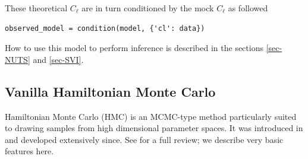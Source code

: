 \documentclass[twocolumn,twocolappendix,nofootinbib,iop]{openjournal}
\newcommand{\nblink}[1]{\href{https://github.com/DifferentiableUniverseInitiative/jax-cosmo-paper/blob/master/notebooks/#1.ipynb}{\faFileCodeO}}
\newcommand{\numpyro}{\texttt{NumPyro}}
\newcommand{\jaxcosmo}{\texttt{jax-cosmo}}
\begin{document}
These theoretical $C_{\ell}$ are in turn conditioned by the mock $C_\ell$ as followed
\begin{lstlisting}[language=iPython]
observed_model = condition(model, {'cl': data})
\end{lstlisting}
%
%
How to use this model to perform inference is described in the sections \ref{sec-NUTS} and \ref{sec-SVI}.
%
\subsection{Vanilla Hamiltonian Monte Carlo}
%
Hamiltonian Monte Carlo (HMC) is an MCMC-type method particularly suited to drawing
samples from high dimensional parameter spaces.  It was introduced in \citep{1987PhLB..195..216D}
and developed extensively since.  See \citet{betancourt} for a full review; we describe
very basic features here.
\end{document}
